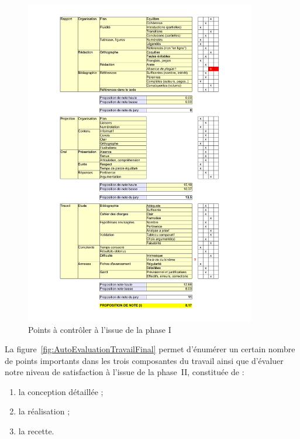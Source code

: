 \documentclass[11pt, french]{report-rd-info}
\begin{document}
\begin{figure}
         \includegraphics[width=0.9\textwidth]{Images/Grille-Evaluation-PRD1}
      \fi
	\caption{Points à contrôler à l'issue de la phase I}
	\label{fig:AutoEvaluationTravailIntermediaire}
\end{figure}

La figure~\ref{fig:AutoEvaluationTravailFinal} permet d'énumérer un certain nombre de points importants dans les trois composantes du travail ainsi que d'évaluer notre niveau de satisfaction à l'issue de la phase~II, constituée de :
\begin{enumerate}
	\item la conception détaillée ;
	\item la réalisation ;
	\item la recette.
\end{enumerate}
\end{document}
